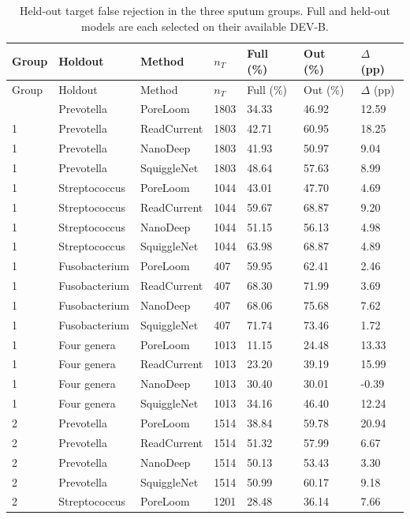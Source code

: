 \begin{longtable}{lllllll}
\caption{Held-out target false rejection in the three sputum groups. Full and held-out models are each selected on their available DEV-B.}\label{tab:s_lso}\\
\toprule
Group & Holdout & Method & $n_T$ & Full (\%) & Out (\%) & $\Delta$ (pp)\\\midrule\endfirsthead
\toprule
Group & Holdout & Method & $n_T$ & Full (\%) & Out (\%) & $\Delta$ (pp)\\\midrule\endhead
\bottomrule\endfoot
1 & Prevotella & PoreLoom & 1803 & 34.33 & 46.92 & 12.59\\
1 & Prevotella & ReadCurrent & 1803 & 42.71 & 60.95 & 18.25\\
1 & Prevotella & NanoDeep & 1803 & 41.93 & 50.97 & 9.04\\
1 & Prevotella & SquiggleNet & 1803 & 48.64 & 57.63 & 8.99\\
1 & Streptococcus & PoreLoom & 1044 & 43.01 & 47.70 & 4.69\\
1 & Streptococcus & ReadCurrent & 1044 & 59.67 & 68.87 & 9.20\\
1 & Streptococcus & NanoDeep & 1044 & 51.15 & 56.13 & 4.98\\
1 & Streptococcus & SquiggleNet & 1044 & 63.98 & 68.87 & 4.89\\
1 & Fusobacterium & PoreLoom & 407 & 59.95 & 62.41 & 2.46\\
1 & Fusobacterium & ReadCurrent & 407 & 68.30 & 71.99 & 3.69\\
1 & Fusobacterium & NanoDeep & 407 & 68.06 & 75.68 & 7.62\\
1 & Fusobacterium & SquiggleNet & 407 & 71.74 & 73.46 & 1.72\\
1 & Four genera & PoreLoom & 1013 & 11.15 & 24.48 & 13.33\\
1 & Four genera & ReadCurrent & 1013 & 23.20 & 39.19 & 15.99\\
1 & Four genera & NanoDeep & 1013 & 30.40 & 30.01 & -0.39\\
1 & Four genera & SquiggleNet & 1013 & 34.16 & 46.40 & 12.24\\
2 & Prevotella & PoreLoom & 1514 & 38.84 & 59.78 & 20.94\\
2 & Prevotella & ReadCurrent & 1514 & 51.32 & 57.99 & 6.67\\
2 & Prevotella & NanoDeep & 1514 & 50.13 & 53.43 & 3.30\\
2 & Prevotella & SquiggleNet & 1514 & 50.99 & 60.17 & 9.18\\
2 & Streptococcus & PoreLoom & 1201 & 28.48 & 36.14 & 7.66\\

\end{longtable}
